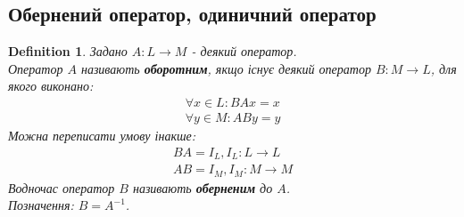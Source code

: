 \documentclass[a4paper, 10pt]{article}
\theoremstyle{theoremdd}
\theoremstyle{theoremdd}
\newtheorem{definition}[theorem]{Definition}
\theoremstyle{theoremdd}
\theoremstyle{theoremdd}
\theoremstyle{theoremdd}
\theoremstyle{theoremdd}
\theoremstyle{theoremdd}
\theoremstyle{theoremdd}
\begin{document}
	\subsection{Обернений оператор, одиничний оператор}
	\begin{definition}
	Задано $A: L \to M$ - деякий оператор.\\
	Оператор $A$ називають \textbf{оборотним}, якщо існує деякий оператор $B: M \to L$, для якого виконано:
	\begin{align*}
	\forall x \in L: BAx = x \\
	\forall y \in M: ABy = y
	\end{align*}
	Можна переписати умову інакше:
	\begin{align*}
	BA = I_L, I_L: L \to L\\
	AB = I_M, I_M: M \to M
	\end{align*}
	Водночас оператор $B$ називають \textbf{оберненим} до $A$.\\
	Позначення: $B = A^{-1}$.
	\end{definition}
	
\end{document}
